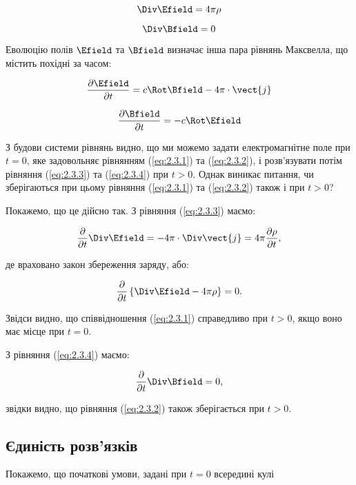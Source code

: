 \begin{equation}
\Div \Efield = 4\pi\rho \label{eq:2.3.1}
\end{equation}

\begin{equation}
\Div \Bfield = 0 \label{eq:2.3.2}
\end{equation}

Еволюцію полів \( \Efield \) та \( \Bfield \) визначає інша пара рівнянь Максвелла, що містить похідні за часом:

\begin{equation}
\frac{\partial \Efield}{\partial t} = c \Rot \Bfield - 4\pi \cdot \vect{j} \label{eq:2.3.3}
\end{equation}

\begin{equation}
\frac{\partial \Bfield}{\partial t} = -c \Rot \Efield \label{eq:2.3.4}
\end{equation}

З будови системи рівнянь видно, що ми можемо задати електромагнітне поле при \( t = 0 \), яке задовольняє рівнянням (\ref{eq:2.3.1}) та
(\ref{eq:2.3.2}), і розв’язувати потім рівняння (\ref{eq:2.3.3}) та (\ref{eq:2.3.4}) при \( t > 0 \). Однак виникає питання, чи зберігаються при цьому
рівняння (\ref{eq:2.3.1}) та (\ref{eq:2.3.2}) також і при \( t > 0 \)?

Покажемо, що це дійсно так. З рівняння (\ref{eq:2.3.3}) маємо:

\[
\frac{\partial}{\partial t} \Div \Efield = -4\pi \cdot \Div \vect{j} = 4\pi \frac{\partial \rho}{\partial t},
\]

де враховано закон збереження заряду, або:

\[
\frac{\partial}{\partial t} \left\{ \Div \Efield - 4\pi\rho \right\} = 0.
\]

Звідси видно, що співвідношення (\ref{eq:2.3.1}) справедливо при \( t > 0 \), якщо воно має місце при \( t = 0 \).

З рівняння (\ref{eq:2.3.4}) маємо:

\[
\frac{\partial}{\partial t} \Div \Bfield = 0,
\]

звідки видно, що рівняння (\ref{eq:2.3.2}) також зберігається при \( t > 0 \).

\subsection*{Єдиність розв’язків}

Покажемо, що початкові умови, задані при \( t = 0 \) всередині кулі

